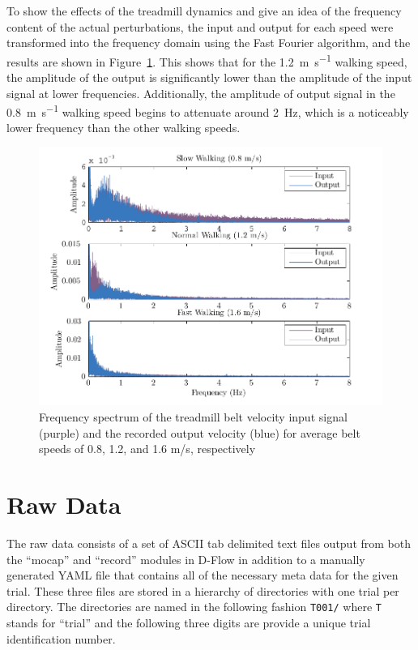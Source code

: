 \documentclass[fleqn,10pt]{wlpeerj}
\begin{document}
To show the effects of the treadmill dynamics and give an idea of the frequency
content of the actual perturbations, the input and output for each speed were
transformed into the frequency domain using the Fast Fourier algorithm, and the
results are shown in Figure~\ref{fig:freq_analysis}. This shows that for the
1.2~\si{\meter\per\second} walking speed, the amplitude of the output is
significantly lower than the amplitude of the input signal at lower
frequencies. Additionally, the amplitude of output signal in the
0.8~\si{\meter\per\second}  walking speed begins to attenuate around
2~\si{\hertz}, which is a noticeably lower frequency than the other walking
speeds.
%
\begin{figure}
  \centering
  \includegraphics{figures/frequency_analysis.pdf}
  \caption{Frequency spectrum of the treadmill belt velocity input signal
    (purple) and the recorded output velocity (blue) for average belt speeds of
    0.8, 1.2, and 1.6 m/s, respectively}
  \label{fig:freq_analysis}
\end{figure}

\section*{Raw Data}
%
The raw data consists of a set of ASCII tab delimited text files output from
both the ``mocap'' and ``record'' modules in D-Flow in addition to a manually
generated YAML file that contains all of the necessary meta data for the given
trial. These three files are stored in a hierarchy of directories with one
trial per directory. The directories are named in the following fashion
\verb+T001/+ where \verb+T+ stands for ``trial'' and the following three digits
are provide a unique trial identification number.
\end{document}
